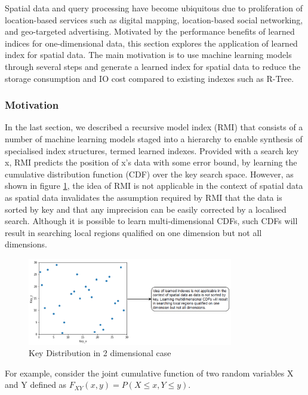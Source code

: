 Spatial data and query processing have become ubiquitous due to proliferation of location-based services such as digital mapping, location-based social networking,
and geo-targeted advertising. Motivated by the performance benefits of learned indices
for one-dimensional data, this section explores the application of learned index for spatial data. The main motivation is to use machine learning models through several steps and generate a learned index for spatial data to reduce the storage consumption and IO cost compared to existing indexes such as R-Tree.

\subsubsection{Motivation}
In the last section, we described a recursive model index (RMI) that consists of a number of machine learning models staged into a hierarchy to enable synthesis of specialised index structures, termed learned indexes. Provided with a search key x, RMI predicts the position of x's data with some error bound, by learning the cumulative distribution function (CDF) over the key search space. However, as shown in figure \ref{fig:Key_Distribution}, the idea of RMI is not applicable in the context of spatial data as spatial data invalidates the assumption required by RMI that the data is sorted by key and that any imprecision can be easily corrected by a localised search. Although it is possible to learn multi-dimensional CDFs, such CDFs will result in searching local regions qualified on one dimension but not all dimensions.

\begin{figure}[t]
    \centering
    \includegraphics[width=0.8\textwidth]{graphs/Key_Distribution_1.png}
    \caption{Key Distribution in 2 dimensional case}
    \label{fig:Key_Distribution}
\end{figure}

For example, consider the joint cumulative function of two random variables X and Y defined as $F_{XY}(x, y)=P(X\leq x, Y\leq y)$.

